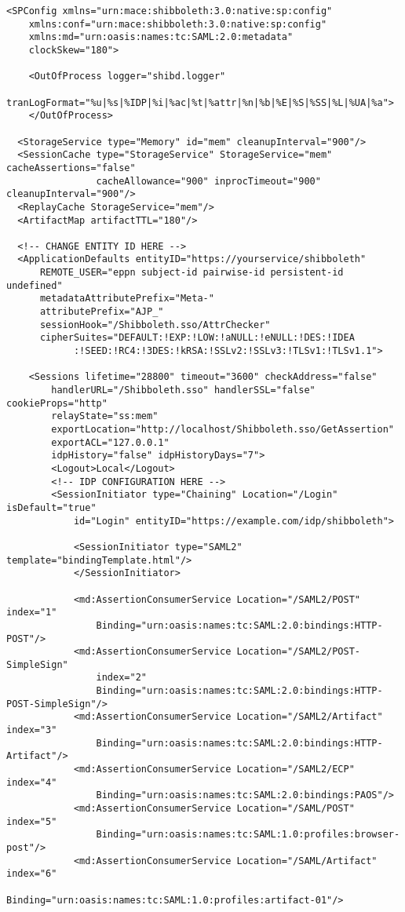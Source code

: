 \begin{verbatim}
<SPConfig xmlns="urn:mace:shibboleth:3.0:native:sp:config"
    xmlns:conf="urn:mace:shibboleth:3.0:native:sp:config"
    xmlns:md="urn:oasis:names:tc:SAML:2.0:metadata"
    clockSkew="180">

    <OutOfProcess logger="shibd.logger" 
        tranLogFormat="%u|%s|%IDP|%i|%ac|%t|%attr|%n|%b|%E|%S|%SS|%L|%UA|%a">
    </OutOfProcess>

  <StorageService type="Memory" id="mem" cleanupInterval="900"/>
  <SessionCache type="StorageService" StorageService="mem" cacheAssertions="false"
                cacheAllowance="900" inprocTimeout="900" cleanupInterval="900"/>
  <ReplayCache StorageService="mem"/>
  <ArtifactMap artifactTTL="180"/>

  <!-- CHANGE ENTITY ID HERE -->
  <ApplicationDefaults entityID="https://yourservice/shibboleth" 
      REMOTE_USER="eppn subject-id pairwise-id persistent-id undefined"
      metadataAttributePrefix="Meta-"
      attributePrefix="AJP_"
      sessionHook="/Shibboleth.sso/AttrChecker"
      cipherSuites="DEFAULT:!EXP:!LOW:!aNULL:!eNULL:!DES:!IDEA
            :!SEED:!RC4:!3DES:!kRSA:!SSLv2:!SSLv3:!TLSv1:!TLSv1.1">

    <Sessions lifetime="28800" timeout="3600" checkAddress="false"
        handlerURL="/Shibboleth.sso" handlerSSL="false" cookieProps="http"
        relayState="ss:mem" 
        exportLocation="http://localhost/Shibboleth.sso/GetAssertion" 
        exportACL="127.0.0.1"
        idpHistory="false" idpHistoryDays="7">
        <Logout>Local</Logout>
        <!-- IDP CONFIGURATION HERE -->
        <SessionInitiator type="Chaining" Location="/Login" isDefault="true"
            id="Login" entityID="https://example.com/idp/shibboleth">

            <SessionInitiator type="SAML2" template="bindingTemplate.html"/>
            </SessionInitiator>

            <md:AssertionConsumerService Location="/SAML2/POST" index="1"
                Binding="urn:oasis:names:tc:SAML:2.0:bindings:HTTP-POST"/>
            <md:AssertionConsumerService Location="/SAML2/POST-SimpleSign" 
                index="2" 
                Binding="urn:oasis:names:tc:SAML:2.0:bindings:HTTP-POST-SimpleSign"/>
            <md:AssertionConsumerService Location="/SAML2/Artifact" index="3"
                Binding="urn:oasis:names:tc:SAML:2.0:bindings:HTTP-Artifact"/>
            <md:AssertionConsumerService Location="/SAML2/ECP" index="4"
                Binding="urn:oasis:names:tc:SAML:2.0:bindings:PAOS"/>
            <md:AssertionConsumerService Location="/SAML/POST" index="5"
                Binding="urn:oasis:names:tc:SAML:1.0:profiles:browser-post"/>
            <md:AssertionConsumerService Location="/SAML/Artifact" index="6"
                Binding="urn:oasis:names:tc:SAML:1.0:profiles:artifact-01"/>


\end{verbatim}
